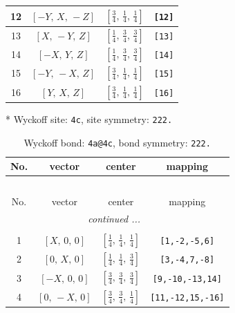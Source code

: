 \documentclass[fleqn,8pt]{jsarticle}
\begin{document}
\begin{longtable}{cccc}
12 & $\left[ - Y,\, X,\, - Z \right]$ & $\left[ \frac{3}{4},\, \frac{1}{4},\, \frac{1}{4} \right]$ & {\tt [12]} \\ \hline
13 & $\left[ X,\, - Y,\, Z \right]$ & $\left[ \frac{1}{4},\, \frac{3}{4},\, \frac{3}{4} \right]$ & {\tt [13]} \\ \hline
14 & $\left[ - X,\, Y,\, Z \right]$ & $\left[ \frac{1}{4},\, \frac{3}{4},\, \frac{3}{4} \right]$ & {\tt [14]} \\ \hline
15 & $\left[ - Y,\, - X,\, Z \right]$ & $\left[ \frac{3}{4},\, \frac{1}{4},\, \frac{1}{4} \right]$ & {\tt [15]} \\ \hline
16 & $\left[ Y,\, X,\, Z \right]$ & $\left[ \frac{3}{4},\, \frac{1}{4},\, \frac{1}{4} \right]$ & {\tt [16]} \\
\end{longtable}
* Wyckoff site: {\tt 4c}, site symmetry: {\tt 222.}
\renewcommand{\arraystretch}{1.2}
\begin{longtable}{cccc}
\caption{Wyckoff bond: {\tt 4a@4c}, bond symmetry: {\tt 222.}}
 \\
 \hline \hline
No. & vector & center & mapping \\ \hline \endfirsthead

\multicolumn{3}{l}{\tablename\ \thetable{}} \\
 \hline \hline
No. & vector & center & mapping \\ \hline \endhead

 \hline \hline
\multicolumn{3}{r}{\footnotesize\it continued ...} \\ \endfoot

 \hline \hline
\multicolumn{3}{r}{} \\ \endlastfoot

1 & $\left[ X,\, 0,\, 0 \right]$ & $\left[ \frac{1}{4},\, \frac{1}{4},\, \frac{1}{4} \right]$ & {\tt [1,-2,-5,6]} \\ \hline
2 & $\left[ 0,\, X,\, 0 \right]$ & $\left[ \frac{1}{4},\, \frac{1}{4},\, \frac{3}{4} \right]$ & {\tt [3,-4,7,-8]} \\ \hline
3 & $\left[ - X,\, 0,\, 0 \right]$ & $\left[ \frac{3}{4},\, \frac{3}{4},\, \frac{3}{4} \right]$ & {\tt [9,-10,-13,14]} \\ \hline
4 & $\left[ 0,\, - X,\, 0 \right]$ & $\left[ \frac{3}{4},\, \frac{3}{4},\, \frac{1}{4} \right]$ & {\tt [11,-12,15,-16]} \\
\end{longtable}
\renewcommand{\arraystretch}{1.2}
\end{document}
